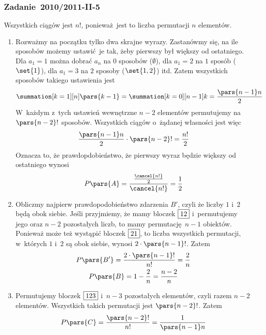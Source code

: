 \subsubsection*{Zadanie~2010/2011-II-5}
Wszystkich ciągów jest \(n!\), ponieważ jest to liczba permutacji \(n\) elementów.
\begin{enumerate}[label={\Alph*:}]
    \item Rozważmy na początku tylko dwa skrajne wyrazy. Zastanówmy się, na ile sposobów możemy ustawić je tak, żeby pierwszy był większy od ostatniego. Dla \(a_1 = 1\) można dobrać \(a_n\) na \(0\) sposobów (\(\emptyset\)), dla \(a_1 = 2\) na \(1\) sposób (\(\set{1}\)), dla \(a_1 = 3\) na \(2\) sposoby (\(\set{1, 2}\)) itd. Zatem wszystkich sposobów takiego ustawienia jest
        \begin{equation*}
            \summation[k = 1][n] \pars{k - 1}
            = \summation[k = 0][n - 1] k
            = \frac{\pars{n - 1}n}{2}
        \end{equation*}
        W~każdym z~tych ustawień wewnętrzne \(n - 2\) elementów permutujemy na \(\pars{n - 2}!\) sposobów. Wszystkich ciągów o~żądanej własności jest więc
        \begin{equation*}
            \frac{\pars{n - 1}n}{2} \cdot \pars{n - 2}!
            = \frac{n!}{2}
        \end{equation*}
        Oznacza to, że prawdopdobieństwo, że pierwszy wyraz będzie większy od ostatniego wynosi
        \begin{equation*}
            P\pars{A}
            = \frac{\frac{\cancel{n!}}{2}}{\cancel{n!}}
            = \frac{1}{2}
        \end{equation*}
    \item Obliczmy najpierw prawdopodobieństwo zdarzenia \(B'\), czyli że liczby \(1\) i~\(2\) będą obok siebie. Jeśli przyjmiemy, że mamy bloczek \(\fbox{12}\) i~permutujemy jego oraz \(n - 2\) pozostałych liczb, to mamy permutację \(n - 1\) obiektów. Ponieważ może też wystąpić bloczek \(\fbox{21}\), to liczba wszystkich permutacji, w~których \(1\) i~\(2\) są obok siebie, wynosi \(2 \cdot \pars{n - 1}!\). Zatem
        \begin{gather*}
            P\pars{B'}
            = \frac{2 \cdot \pars{n - 1}!}{n!}
            = \frac{2}{n}\\
            P\pars{B}
            = 1 - \frac{2}{n}
            = \frac{n - 2}{n}
        \end{gather*}
    \item Permutujemy bloczek \(\fbox{123}\) i~\(n - 3\) pozostałych elementów, czyli razem \(n - 2\) elementów. Wszystkich takich permutacji jest \(\pars{n - 2}!\). Zatem
        \begin{equation*}
            P\pars{C}
            = \frac{\pars{n - 2}!}{n!}
            = \frac{1}{\pars{n - 1}n}
        \end{equation*}
\end{enumerate}
